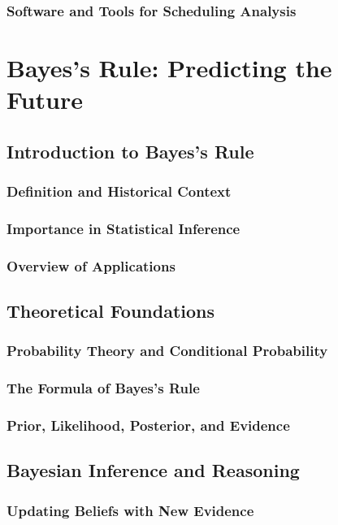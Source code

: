 \documentclass[12pt]{book} %
\begin{document}
\subsection{Software and Tools for Scheduling Analysis}

\chapter{Bayes's Rule: Predicting the Future}

\section{Introduction to Bayes's Rule}
\subsection{Definition and Historical Context}
\subsection{Importance in Statistical Inference}
\subsection{Overview of Applications}

\section{Theoretical Foundations}
\subsection{Probability Theory and Conditional Probability}
\subsection{The Formula of Bayes's Rule}
\subsection{Prior, Likelihood, Posterior, and Evidence}

\section{Bayesian Inference and Reasoning}
\subsection{Updating Beliefs with New Evidence}
\end{document}
